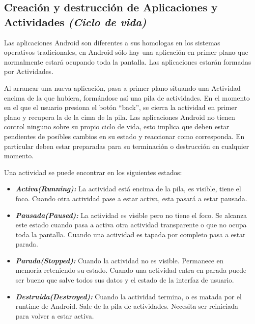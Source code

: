 \subsection{Creación y destrucción de Aplicaciones y Actividades \textit{(Ciclo de vida)}}

Las aplicaciones Android son diferentes a sus homologas en los sistemas operativos tradicionales, en Android sólo hay una aplicación en primer plano que normalmente estará ocupando toda la pantalla. Las aplicaciones estarán formadas por Actividades.
 
Al arrancar una nueva aplicación, pasa a primer plano situando una Actividad encima de la que hubiera, formándose así una pila de actividades. En el momento en el que el usuario presiona el botón “back”, se cierra la actividad en primer plano y recupera la de la cima de la pila. 
Las aplicaciones Android no tienen control ninguno sobre su propio ciclo de vida, esto implica que deben estar pendientes de posibles cambios en su estado y reaccionar como corresponda. En particular deben estar preparadas para su terminación o destrucción en cualquier momento. 
 
Una actividad se puede encontrar en los siguientes estados: 
\begin{itemize}	
	\item \emph{\textbf{Activa\textit{(Running)}: }}  La actividad está encima de la pila, es visible, tiene el foco. Cuando otra actividad pase a estar activa, esta pasará a estar pausada. 
	
	\item \emph{\textbf{Pausada\textit{(Paused)}: }} La actividad es visible pero no tiene el foco. Se alcanza este estado cuando pasa a activa otra actividad transparente o que no ocupa toda la pantalla. Cuando una actividad es tapada por completo pasa a estar parada. 
	
	\item \emph{\textbf{Parada\textit{(Stopped)}: }} Cuando la actividad no es visible. Permanece en memoria reteniendo su estado. Cuando una actividad entra en parada puede ser bueno que salve todos sus datos y el estado de la interfaz de usuario. 

	\item \emph{\textbf{Destruida\textit{(Destroyed)}: }} Cuando la actividad termina, o es matada por el runtime de Android. Sale de la pila de actividades. Necesita ser reiniciada para volver a estar activa. 
\end{itemize}

